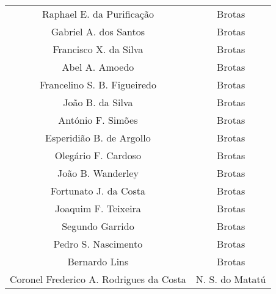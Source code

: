 \begin{tiny}
\begin{longtable}{cc}
Raphael E. da Purificação & Brotas \\
Gabriel A. dos Santos & Brotas \\
Francisco X. da Silva & Brotas \\
Abel A. Amoedo & Brotas \\
Francelino S. B. Figueiredo & Brotas \\
João B. da Silva & Brotas \\
António F. Simões & Brotas \\
Esperidião B. de Argollo & Brotas \\
Olegário F. Cardoso & Brotas \\
João B. Wanderley & Brotas \\
Fortunato J. da Costa & Brotas \\
Joaquim F. Teixeira & Brotas \\
Segundo Garrido & Brotas \\
Pedro S. Nascimento & Brotas \\
Bernardo Lins & Brotas \\
Coronel Frederico A. Rodrigues da Costa & N. S. do Matatú \\
\hline
\end{longtable}
\end{tiny}